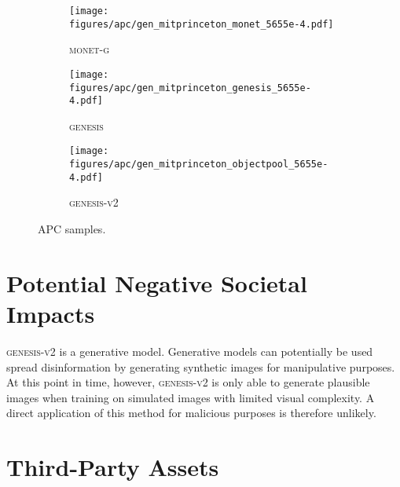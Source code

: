 \documentclass{article}
\begin{document}
\begin{figure}[h!]
	\centering
	\begin{subfigure}{\linewidth}
	    \texttt{[image: figures/apc/gen\_mitprinceton\_monet\_5655e-4.pdf]}
	    \caption{\textsc{monet-g}}
	    \vspace{6pt}
	\end{subfigure}
	\begin{subfigure}{\linewidth}
	    \texttt{[image: figures/apc/gen\_mitprinceton\_genesis\_5655e-4.pdf]}
	    \caption{\textsc{genesis}}
	    \vspace{6pt}
	\end{subfigure}
	\begin{subfigure}{\linewidth}
	    \texttt{[image: figures/apc/gen\_mitprinceton\_objectpool\_5655e-4.pdf]}
	    \caption{\textsc{genesis-v2}}
	\end{subfigure}
	\caption{APC samples.}
	\label{fig:gpp:apc:gen}
\end{figure}

\clearpage

\section{Potential Negative Societal Impacts}
\label{app:societal_impacts}

\textsc{genesis-v2} is a generative model.
Generative models can potentially be used spread disinformation by generating synthetic images for manipulative purposes.
At this point in time, however, \mbox{\textsc{genesis-v2}} is only able to generate plausible images when training on simulated images with limited visual complexity.
A direct application of this method for malicious purposes is therefore unlikely.


\section{Third-Party Assets}
\label{app:assets}
\end{document}
